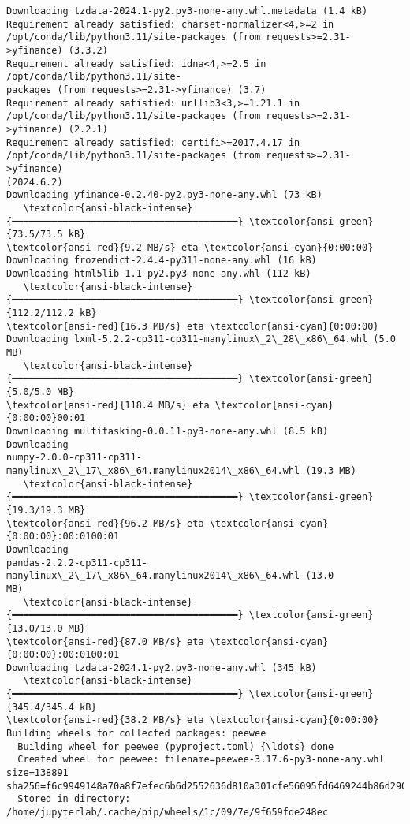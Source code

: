 \documentclass[11pt]{article}
\begin{document}
\begin{Verbatim}[commandchars=\\\{\}]
  Downloading tzdata-2024.1-py2.py3-none-any.whl.metadata (1.4 kB)
Requirement already satisfied: charset-normalizer<4,>=2 in
/opt/conda/lib/python3.11/site-packages (from requests>=2.31->yfinance) (3.3.2)
Requirement already satisfied: idna<4,>=2.5 in /opt/conda/lib/python3.11/site-
packages (from requests>=2.31->yfinance) (3.7)
Requirement already satisfied: urllib3<3,>=1.21.1 in
/opt/conda/lib/python3.11/site-packages (from requests>=2.31->yfinance) (2.2.1)
Requirement already satisfied: certifi>=2017.4.17 in
/opt/conda/lib/python3.11/site-packages (from requests>=2.31->yfinance)
(2024.6.2)
Downloading yfinance-0.2.40-py2.py3-none-any.whl (73 kB)
   \textcolor{ansi-black-intense}{━━━━━━━━━━━━━━━━━━━━━━━━━━━━━━━━━━━━━━━━} \textcolor{ansi-green}{73.5/73.5 kB}
\textcolor{ansi-red}{9.2 MB/s} eta \textcolor{ansi-cyan}{0:00:00}
Downloading frozendict-2.4.4-py311-none-any.whl (16 kB)
Downloading html5lib-1.1-py2.py3-none-any.whl (112 kB)
   \textcolor{ansi-black-intense}{━━━━━━━━━━━━━━━━━━━━━━━━━━━━━━━━━━━━━━━━} \textcolor{ansi-green}{112.2/112.2 kB}
\textcolor{ansi-red}{16.3 MB/s} eta \textcolor{ansi-cyan}{0:00:00}
Downloading lxml-5.2.2-cp311-cp311-manylinux\_2\_28\_x86\_64.whl (5.0 MB)
   \textcolor{ansi-black-intense}{━━━━━━━━━━━━━━━━━━━━━━━━━━━━━━━━━━━━━━━━} \textcolor{ansi-green}{5.0/5.0 MB}
\textcolor{ansi-red}{118.4 MB/s} eta \textcolor{ansi-cyan}{0:00:00}00:01
Downloading multitasking-0.0.11-py3-none-any.whl (8.5 kB)
Downloading
numpy-2.0.0-cp311-cp311-manylinux\_2\_17\_x86\_64.manylinux2014\_x86\_64.whl (19.3 MB)
   \textcolor{ansi-black-intense}{━━━━━━━━━━━━━━━━━━━━━━━━━━━━━━━━━━━━━━━━} \textcolor{ansi-green}{19.3/19.3 MB}
\textcolor{ansi-red}{96.2 MB/s} eta \textcolor{ansi-cyan}{0:00:00}:00:0100:01
Downloading
pandas-2.2.2-cp311-cp311-manylinux\_2\_17\_x86\_64.manylinux2014\_x86\_64.whl (13.0
MB)
   \textcolor{ansi-black-intense}{━━━━━━━━━━━━━━━━━━━━━━━━━━━━━━━━━━━━━━━━} \textcolor{ansi-green}{13.0/13.0 MB}
\textcolor{ansi-red}{87.0 MB/s} eta \textcolor{ansi-cyan}{0:00:00}:00:0100:01
Downloading tzdata-2024.1-py2.py3-none-any.whl (345 kB)
   \textcolor{ansi-black-intense}{━━━━━━━━━━━━━━━━━━━━━━━━━━━━━━━━━━━━━━━━} \textcolor{ansi-green}{345.4/345.4 kB}
\textcolor{ansi-red}{38.2 MB/s} eta \textcolor{ansi-cyan}{0:00:00}
Building wheels for collected packages: peewee
  Building wheel for peewee (pyproject.toml) {\ldots} done
  Created wheel for peewee: filename=peewee-3.17.6-py3-none-any.whl
size=138891
sha256=f6c9949148a70a8f7efec6b6d2552636d810a301cfe56095fd6469244b86d290
  Stored in directory: /home/jupyterlab/.cache/pip/wheels/1c/09/7e/9f659fde248ec

\end{Verbatim}
\end{document}
